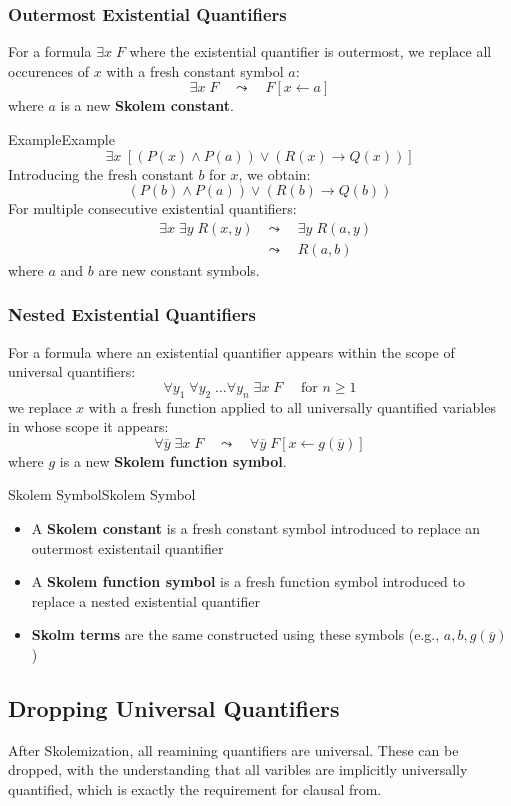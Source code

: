 \documentclass[a4paper]{article}
\theoremstyle{definition}
\begin{document}
\subsubsection{Outermost Existential Quantifiers}
For a formula \( \exists x\; F \) where the existential quantifier is outermost, we replace all occurences of 
\( x \) with a fresh constant symbol \( a \):
\[
  \exists x\; F \quad \leadsto \quad F[x \leftarrow a]
\]
where \( a \) is a new \textbf{Skolem constant}.
\begin{example}{Example}{Example}
\[
  \exists x\; [(P(x) \wedge P(a)) \vee (R(x) \rightarrow Q(x))]
\]
Introducing the fresh constant \( b \) for \( x \), we obtain:
\[
  (P(b) \wedge P(a)) \vee (R(b) \rightarrow Q(b))
\]
For multiple consecutive existential quantifiers:
\begin{align*}
	& \exists x\; \exists y\; R(x,y) & \leadsto \quad \exists y\; R(a,y) \\
	& & \leadsto \quad R(a,b)
\end{align*}
where \( a \) and \( b \) are new constant symbols.
\end{example}
\subsubsection{Nested Existential Quantifiers}
For a formula where an existential quantifier appears within the scope of universal quantifiers:
\[
  \forall y_1\; \forall y_2\; \ldots \forall y_n\; \exists x\; F \quad \text{ for } n \geq 1
\]
we replace \( x \) with a fresh function applied to all universally quantified variables in whose scope it appears:
\[
  \forall \overline{y}\; \exists x\; F \quad \leadsto \quad \forall \overline{y}\; F[x \leftarrow g(\overline{y})]
\]
where \( g \) is a new \textbf{Skolem function symbol}.
\begin{definition}{Skolem Symbol}{Skolem Symbol}
\begin{itemize}
	\item A \textbf{Skolem constant} is a fresh constant symbol introduced to replace an outermost existentail quantifier 
	\item A \textbf{Skolem function symbol} is a fresh function symbol introduced to replace a nested existential quantifier 
	\item \textbf{Skolm terms} are the same constructed using these symbols (e.g., $a,b,g(\overline{y})$)
\end{itemize}
\end{definition}
\subsection{Dropping Universal Quantifiers}
After Skolemization, all reamining quantifiers are universal. These can be dropped, with the understanding that all varibles are 
implicitly universally quantified, which is exactly the requirement for clausal from.
\end{document}
